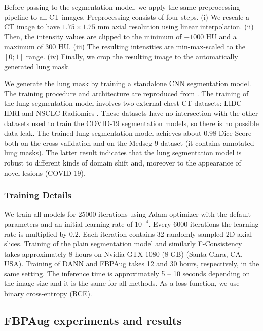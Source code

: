 Before passing to the segmentation model, we apply the same preprocessing pipeline to all CT images. Preprocessing consists of four steps. (i) We rescale a CT image to have $1.75 \times 1.75$ mm axial resolution {using linear interpolation}. (ii) Then, the intensity values are clipped to the minimum of $-1000$ HU and a maximum of $300$ HU. (iii) The resulting intensities are min-max-scaled to the $[0; 1]$ range. (iv) Finally, we crop the resulting image to the automatically generated lung mask.

We generate the lung mask by training a standalone CNN segmentation model. The training procedure and architecture are reproduced from \cite{goncharov2021ct}. The training of the lung segmentation model involves two external chest CT datasets: LIDC-IDRI \cite{lidc} and NSCLC-Radiomics \cite{nsclc1,nsclc2}. These datasets have no intersection with the other datasets used to train the COVID-19 segmentation models, so there is no possible data leak. The trained lung segmentation model achieves about $0.98$ Dice Score both on the cross-validation and on the Medseg-9 dataset (it contains annotated lung masks). The latter result indicates that the lung segmentation model is robust to different kinds of domain shift and, moreover to the appearance of novel lesions (COVID-19).

\subsubsection{Training Details}

We train all models for 25000 iterations using Adam \cite{kingma2014adam} optimizer with the default parameters and an initial learning rate of $10^{-4}$. Every 6000 iterations the learning rate is multiplied by $0.2$. Each iteration contains 32 randomly sampled 2D axial slices. Training of the plain segmentation model and similarly F-Consistency takes approximately 8 hours on Nvidia GTX 1080 (8 GB) (Santa Clara, CA, USA). Training of DANN and FBPAug takes 12 and 30 hours, respectively, in the same setting. The inference time is approximately 5 -- 10 seconds depending on the image size and it is the same for all methods. As a loss function, we use binary cross-entropy (BCE).



\subsection{FBPAug experiments and results}


